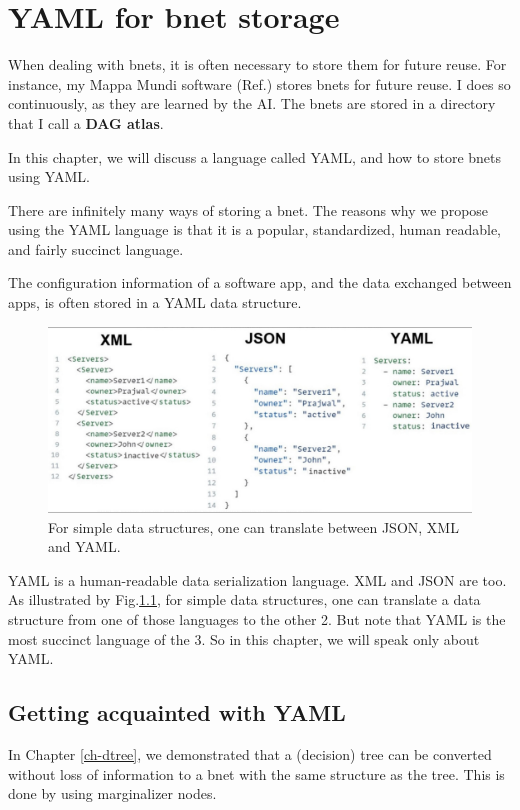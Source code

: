 \chapter{ YAML for bnet storage}

When dealing with bnets,
it is often necessary to store
them for future reuse.
 For instance, my Mappa Mundi
software (Ref.\cite{mappa-mundi}) stores
bnets
for future reuse. I does so
continuously, 
as they are learned by the AI. The bnets are stored in a directory that I call a {\bf DAG atlas}.

In this chapter, we will discuss a language called YAML, 
and how to store bnets using YAML.



There are infinitely many ways of storing a bnet. 
The reasons why we propose using the YAML
language is that it is a popular,
standardized,
human readable, and fairly succinct language.

The configuration information of a software app, and the data exchanged between apps,  is often stored in a  YAML data structure.

\begin{figure}[h!]
\centering
\includegraphics[width=6in]
{yaml/json-xml-yaml.jpg}
\caption{For simple data structures,
one can translate between JSON, XML and YAML.}
\label{fig-json-xml-yaml}
\end{figure}

YAML is a human-readable data serialization language.
XML and JSON are too.
As illustrated by Fig.\ref{fig-json-xml-yaml}, for simple data structures, one can translate a data structure
from one of those languages to the other 2. 
But note that
YAML is the most succinct 
language of the 3.
So in this chapter, we will speak only about YAML.

\section{Getting acquainted with YAML}
In Chapter \ref{ch-dtree},
we demonstrated that a (decision) tree
can be converted without loss of
information to a bnet with the
same structure as the tree.
This is done by using marginalizer nodes.

